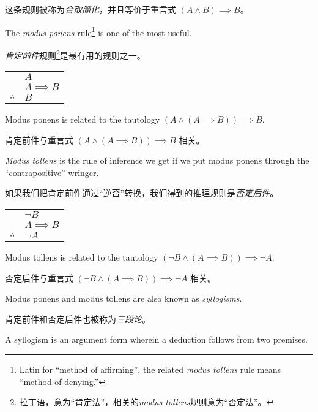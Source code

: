 \noindent 这条规则被称为\emph{合取简化}，并且等价于重言式 $(A \land B) \implies B$。

The \emph{modus ponens} 
rule\footnote{Latin for ``method of affirming'',
the related \emph{modus tollens} rule means ``method of denying.'' } 
is one of the most useful.

\emph{肯定前件}规则\footnote{拉丁语，意为“肯定法”，相关的\emph{modus tollens}规则意为“否定法”。}是最有用的规则之一。

\begin{center}
\begin{tabular}{cl}
 & $A$ \\
 & $A \implies B$ \\ \hline
$\therefore$ & $B$ \\
\end{tabular}
\end{center}

Modus ponens is related to the tautology $(A \land (A \implies B)) \implies B$.

肯定前件与重言式 $(A \land (A \implies B)) \implies B$ 相关。

\emph{Modus tollens} 
is the rule of inference we get if we put modus ponens 
through the ``contrapositive'' wringer.

如果我们把肯定前件通过“逆否”转换，我们得到的推理规则是\emph{否定后件}。

\begin{center}
\begin{tabular}{cl}
 & ${\lnot}B$ \\
 & $A \implies B$ \\ \hline
$\therefore$ & ${\lnot}A$ \\
\end{tabular}
\end{center}

Modus tollens is related to the tautology $({\lnot}B \land (A \implies B)) \implies {\lnot}A$.

否定后件与重言式 $({\lnot}B \land (A \implies B)) \implies {\lnot}A$ 相关。

Modus ponens and modus tollens are also known as 
\emph{syllogisms}.

肯定前件和否定后件也被称为\emph{三段论}。

A 
syllogism is an argument form wherein a deduction follows from two premises.

